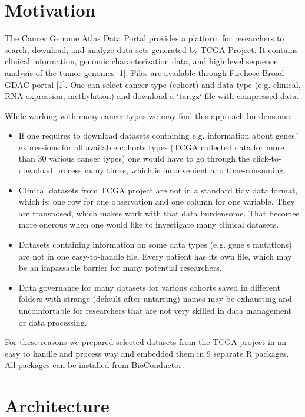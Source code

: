 \documentclass{bioinfo}
\begin{document}
\section*{Motivation}
The Cancer Genome Atlas Data Portal provides a platform for researchers to search, download, and analyze data sets generated by TCGA Project. It contains clinical information, genomic characterization data, and high level sequence analysis of the tumor genomes [1]. Files are available through Firehose Broad GDAC portal [1]. One can select cancer type (cohort) and data type (e.g. clinical, RNA expression, methylation) and download a `tar.gz` file with compressed data. 

While working with many cancer types we may find this approach burdensome:

\begin{itemize}
\item If one requires to download datasets containing e.g. information about genes' expressions for all available cohorts types (TCGA collected data for more than 30 various cancer types) one would have to go through the click-to-download process many times, which is inconvenient and time-consuming.
\item Clinical datasets from TCGA project are not in a standard tidy data format, which is: one row for one observation and one column for one variable. They are transposed, which makes work with that data burdensome. That becomes more onerous when one would like to investigate many clinical datasets.
\item Datasets containing information on some data types (e.g. gene's mutations) are not in one easy-to-handle file. Every patient has its own file, which may be an impassable barrier for many potential researchers. 
\item Data governance for many datasets for various cohorts saved in different folders with strange (default after untarring) names may be exhausting and uncomfortable for researchers that are not very skilled in data management or data processing.
\end{itemize}
For these reasons we prepared selected datasets from the TCGA project in an easy to handle and process way and embedded them in 9 separate R packages. All packages can be installed from BioConductor.

\section*{Architecture}
\end{document}
